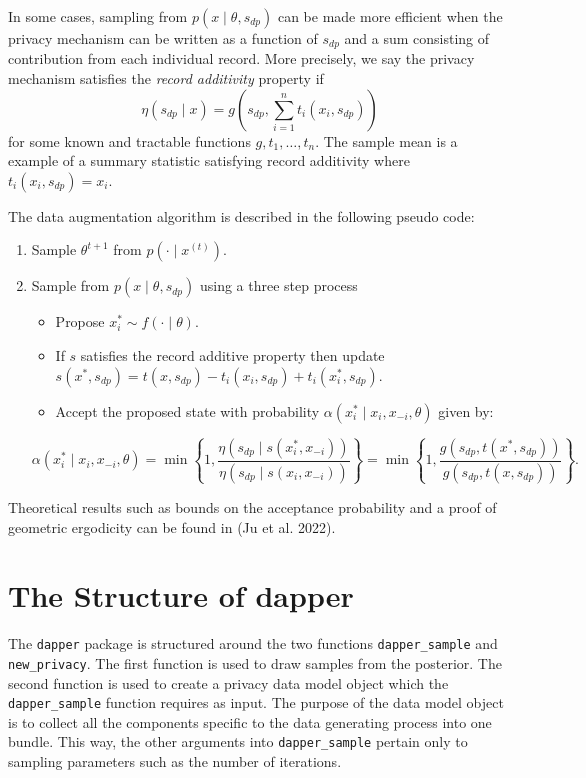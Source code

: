 In some cases, sampling from \(p(x \mid \theta, s_{dp})\) can be made more efficient
when the privacy mechanism can be written as a function of \(s_{dp}\) and
a sum consisting of contribution from each individual record. More precisely, we say the privacy mechanism satisfies
the \emph{record additivity} property if
\[
\eta(s_{dp} \mid x) = g\left(s_{dp}, \sum_{i=1}^{n}t_i(x_i, s_{dp}) \right)
\]
for some known and tractable functions \(g, t_1, \ldots, t_n\). The sample mean is a
example of a summary statistic satisfying record additivity where \(t_i(x_i, s_{dp}) = x_i\).

The data augmentation algorithm is described in the following pseudo code:

\begin{enumerate}
\def\labelenumi{\arabic{enumi}.}
\tightlist
\item
  Sample \(\theta^{t+1}\) from \(p(\cdot \mid x^{(t)})\).
\item
  Sample from \(p(x \mid \theta, s_{dp})\) using a three step process

  \begin{itemize}
  \tightlist
  \item
    Propose \(x_{i}^{*} \sim f(\cdot \mid \theta)\).
  \item
    If \(s\) satisfies the record additive property then
    update \(s(x^*, s_{dp}) = t(x,s_{dp}) - t_i(x_i,s_{dp}) + t_{i}(x_i^*, s_{dp})\).
  \item
    Accept the proposed state with probability \(\alpha(x_i^* \mid x_i, x_{-i}, \theta)\)
    given by:
  \end{itemize}

  \[
     \alpha(x_i^* \mid x_i, x_{-i}, \theta) = \min \left\{ 1, \dfrac{\eta(s_{dp} \mid s(x_i^*, x_{-i}))}{\eta(s_{dp} \mid s(x_i, x_{-i}))} \right\}  
     = \min \left\{ 1, \dfrac{g(s_{dp}, t(x^*, s_{dp}))}{g(s_{dp}, t(x,s_{dp}))} \right\}.
   \]
\end{enumerate}

Theoretical results such as bounds on the acceptance probability and a proof
of geometric ergodicity can be found in (Ju et al. 2022).

\hypertarget{the-structure-of-dapper}{%
\section{The Structure of dapper}\label{the-structure-of-dapper}}

The \texttt{dapper} package is structured around the two functions \texttt{dapper\_sample} and
\texttt{new\_privacy}. The first function is used to draw samples from the
posterior. The second function is used to create a privacy data model object
which the \texttt{dapper\_sample} function requires as input. The purpose of the data model
object is to collect all the components specific to the data generating process
into one bundle. This way, the other arguments into \texttt{dapper\_sample} pertain only
to sampling parameters such as the number of iterations.

